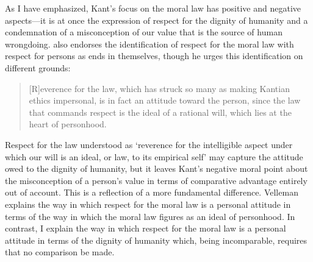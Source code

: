 \documentclass[12pt]{article}
\begin{document}
% 

As I have emphasized, Kant's focus on the moral law has positive and negative aspects---it is at once the expression of respect for the dignity of humanity and a condemnation of a misconception of our value that is the source of human wrongdoing. \citet{Velleman:2006nx} also endorses the identification of respect for the moral law with respect for persons as ends in themselves, though he urges this identification on different grounds:
\begin{quote}
	[R]everence for the law, which has struck so many as making Kantian ethics impersonal, is in fact an attitude toward the person, since the law that commands respect is the ideal of a rational will, which lies at the heart of personhood. \citep[81]{Velleman:2006nx}
\end{quote}
Respect for the law understood as `reverence for the intelligible aspect under which our will is an ideal, or law, to its empirical self' \citep[80]{Velleman:2006nx} may capture the attitude owed to the dignity of humanity, but it leaves Kant's negative moral point about the misconception of a person's value in terms of comparative advantage entirely out of account. This is a reflection of a more fundamental difference. Velleman explains the way in which respect for the moral law is a personal attitude in terms of the way in which the moral law figures as an ideal of personhood. In contrast, I explain the way in which respect for the moral law is a personal attitude in terms of the dignity of humanity which, being incomparable, requires that no comparison be made.
\end{document}
